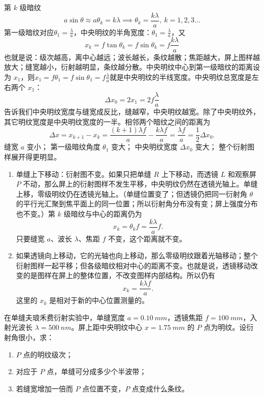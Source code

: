 \begin{theorem}
第 \(k\) 级暗纹
\[a\sin\theta\approx a\theta_k=k\lambda\implies \theta_k=\frac{k\lambda}{a},~k=1,2,3...\]第一级暗纹对应$\theta_1=\frac{\lambda}{a}$，中央明纹的半角宽度：$\theta_1=\frac{\lambda}{a}$，又
\[
x_k=f\tan\theta_k=f\sin\theta_k=f\frac{k\lambda}{a}
\]也就是说：级次越高，离中心越远；波长越长，条纹越散；焦距越大，屏上图样越放大；缝宽越小，衍射越明显，条纹越分散。中央明纹中心到第一级暗纹的距离设为 \(x_1\)，则$x_1=f\theta_1=f\sin\theta_1=f\frac{\lambda}{a}$就是中央明纹的半线宽度。中央明纹总宽度是左右两个 \(x_1\)：
\[
\Delta x_0=2x_1=2f\frac{\lambda}{a}
\]告诉我们中央明纹宽度与缝宽成反比，缝越窄，中央明纹越宽。除了中央明纹外，其它明纹宽度是中央明纹宽度的一半。相邻两个暗纹之间的距离为
\[
\Delta x=x_{k+1}-x_k=\frac{(k+1)\lambda f}{a}-\frac{k\lambda f}{a}=\frac{\lambda f}{a}=\frac12\Delta x_0.
\]缝宽 \(a\) 变小；
第一级暗纹角度 \(\theta_1\) 变大；
中央明纹宽度 \(\Delta x_0\) 变大；
整个衍射图样展开得更明显。
\end{theorem}

\begin{theorem}[单缝衍射的动态变化]
\begin{enumerate}
\item 单缝上下移动：衍射图不变。如果只把单缝 \(R\) 上下移动，而透镜 \(L\) 和观察屏 \(P\) 不动，那么屏上的衍射图样不发生平移，中央明纹仍然在透镜光轴上。单缝上移，零级明纹仍在透镜光轴上。（单缝位置变了；但透镜仍把同一衍射角 \(\theta\) 的平行光汇聚到焦平面上的同一位置；所以衍射角分布没有变；屏上强度分布也不变。）第 \(k\) 级暗纹与中心的距离仍为
\[
x_k=\theta_k f=\frac{k\lambda}{a}f.
\]只要缝宽 \(a\)、波长 \(\lambda\)、焦距 \(f\) 不变，这个距离就不变。
\item 如果透镜向上移动，它的光轴也向上移动，那么零级明纹跟着光轴移动；整个衍射图样一起平移；但各级暗纹相对中心的距离不变。也就是说，透镜移动改变的是图样在屏上的整体位置，不改变图样内部结构。所以仍有
\[
x_k=\frac{k\lambda f}{a}.
\]这里的 \(x_k\) 是相对于新的中心位置测量的。
\end{enumerate}    
\end{theorem}


\begin{exercise}
在单缝夫琅禾费衍射实验中，单缝宽度 \(a=\SI{0.10}{mm}\)，透镜焦距 \(f=\SI{100}{mm}\)，入射光波长 \(\lambda=\SI{500}{nm}\)。屏上距中央明纹中心 \(x=\SI{1.75}{mm}\) 的 \(P\) 点为明纹。设衍射角很小，求：
\begin{enumerate}
\item \(P\) 点的明纹级次；
\item 对应于 \(P\) 点，单缝可分成多少个半波带；
\item 若缝宽增加一倍而 \(P\) 点位置不变，\(P\) 点变成什么条纹。
\end{enumerate}
\end{exercise}


